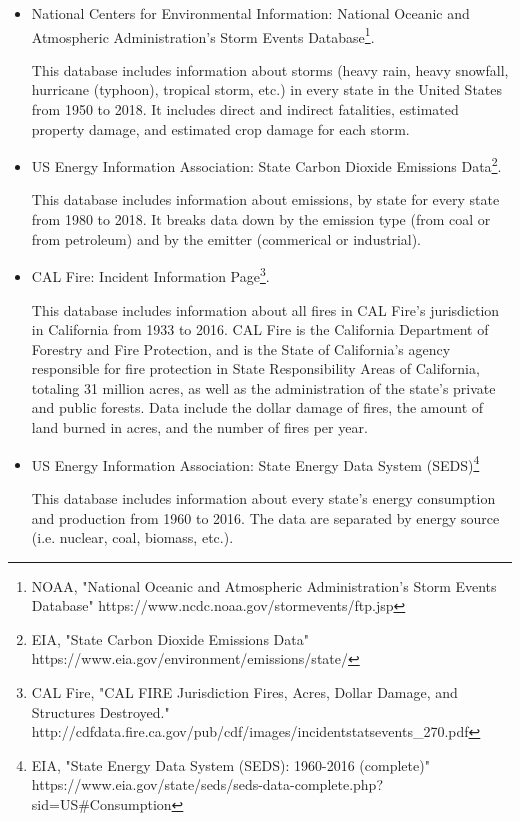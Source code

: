 \documentclass[10pt,]{article}
\let\rmarkdownfootnote\footnote%
\def\footnote{\protect\rmarkdownfootnote}
\begin{document}
\begin{itemize}
  \item National Centers for Environmental Information: National Oceanic and Atmospheric Administration's Storm Events Database\footnote{NOAA, "National Oceanic and Atmospheric Administration's Storm Events Database" https://www.ncdc.noaa.gov/stormevents/ftp.jsp}.
  
  This database includes information about storms (heavy rain, heavy snowfall, hurricane (typhoon), tropical storm, etc.) in every state in the United States from 1950 to 2018. It includes direct and indirect fatalities, estimated property damage, and estimated crop damage for each storm.
  \item US Energy Information Association: State Carbon Dioxide Emissions Data\footnote{EIA, "State Carbon Dioxide Emissions Data" https://www.eia.gov/environment/emissions/state/}.
  
  This database includes information about emissions, by state for every state from 1980 to 2018. It breaks data down by the emission type (from coal or from petroleum) and by the emitter (commerical or industrial).
  \item CAL Fire: Incident Information Page\footnote{CAL Fire, "CAL FIRE Jurisdiction Fires, Acres, Dollar Damage, and Structures Destroyed." \newline http://cdfdata.fire.ca.gov/pub/cdf/images/incidentstatsevents\_270.pdf}.
  
  This database includes information about all fires in CAL Fire's jurisdiction in California from 1933 to 2016. CAL Fire is the California Department of Forestry and Fire Protection, and is the State of California's agency responsible for fire protection in State Responsibility Areas of California, totaling 31 million acres, as well as the administration of the state's private and public forests. Data include the dollar damage of fires, the amount of land burned in acres, and the number of fires per year.
  \item US Energy Information Association: State Energy Data System (SEDS)\footnote{EIA, "State Energy Data System (SEDS): 1960-2016 (complete)" \newline https://www.eia.gov/state/seds/seds-data-complete.php?sid=US\#Consumption}
  
  This database includes information about every state's energy consumption and production from 1960 to 2016. The data are separated by energy source (i.e. nuclear, coal, biomass, etc.).
\end{itemize}
\end{document}
